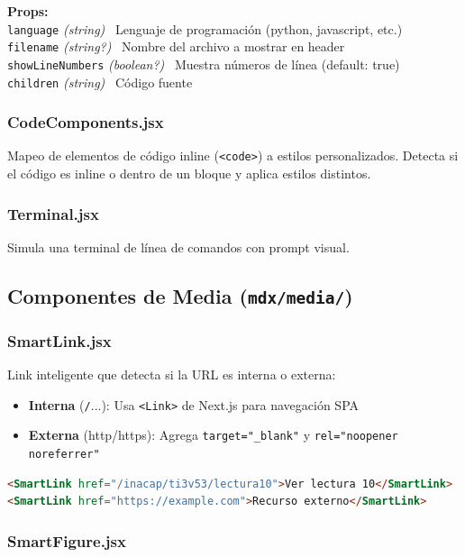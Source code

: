 \documentclass[12pt,a4paper]{article}
\newcommand{\prop}[3]{%
  \texttt{#1} \textit{(#2)} \textemdash\ #3\\%
}
\begin{document}
\begin{mdframed}[style=propbox]
\textbf{Props:}\\
\prop{language}{string}{Lenguaje de programación (python, javascript, etc.)}
\prop{filename}{string?}{Nombre del archivo a mostrar en header}
\prop{showLineNumbers}{boolean?}{Muestra números de línea (default: true)}
\prop{children}{string}{Código fuente}
\end{mdframed}

\subsubsection{CodeComponents.jsx}

Mapeo de elementos de código inline (\texttt{<code>}) a estilos personalizados. Detecta si el código es inline o dentro de un bloque y aplica estilos distintos.

\subsubsection{Terminal.jsx}

Simula una terminal de línea de comandos con prompt visual.

\subsection{Componentes de Media (\texttt{mdx/media/})}

\subsubsection{SmartLink.jsx}

Link inteligente que detecta si la URL es interna o externa:
\begin{itemize}
  \item \textbf{Interna} (\texttt{/}...): Usa \texttt{<Link>} de Next.js para navegación SPA
  \item \textbf{Externa} (http/https): Agrega \texttt{target="\_blank"} y \texttt{rel="noopener noreferrer"}
\end{itemize}

\begin{lstlisting}[language=HTML]
<SmartLink href="/inacap/ti3v53/lectura10">Ver lectura 10</SmartLink>
<SmartLink href="https://example.com">Recurso externo</SmartLink>
\end{lstlisting}

\subsubsection{SmartFigure.jsx}
\end{document}
